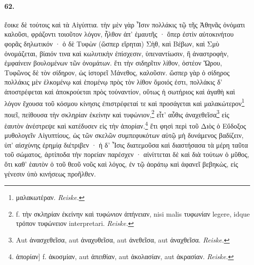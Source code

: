 \documentclass[a4paper, 11pt, oneside, polutonikogreek, german, landscape]{article}
\begin{document}
\paragraph{62.}
ἔοικε δὲ τούτοις καὶ τὰ Αἰγύπτια. τὴν μὲν γὰρ Ἶσιν πολλάκις τῷ τῆς Ἀθηνᾶς ὀνόματι καλοῦσι, φράζοντι τοιοῦτον λόγον, ἦλθον ἀπ' ἐμαυτῆς · ὅπερ ἐστὶν αὐτοκινήτου φορᾶς δηλωτικόν · ὁ δὲ Τυφὼν (ὥσπερ εἴρηται) Σὴθ, καὶ Βέβων, καὶ Σμὺ ὀνομάζεται, βίαιόν τινα καὶ κωλυτικὴν ἐπίσχεσιν, ὑπεναντίωσιν, ἢ ἀναστροφὴν, ἐμφαίνειν βουλομένων τῶν ὀνομάτων. ἔτι τὴν σιδηρῖτιν λίθον, ὀστέον Ὥρου, Τυφῶνος δὲ τὸν σίδηρον, ὡς ἱστορεῖ Μάνεθος, καλοῦσιν. ὥσπερ γὰρ ὁ σίδηρος πολλάκις μὲν ἑλκομένῳ καὶ ἑπομένῳ πρὸς τὸν λίθον ὅμοιός ἐστι, πολλάκις δ' ἀποστρέφεται καὶ ἀποκρούεται πρὸς τοὐναντίον, οὕτως ἡ σωτήριος καὶ ἀγαθὴ καὶ λόγον ἔχουσα τοῦ κόσμου κίνησις ἐπιστρέφεταί τε καὶ προσάγεται καὶ μαλακώτερον\footnote{μαλακωτέραν. \emph{Reiske.}} ποιεῖ, πείθουσα τὴν σκληρίαν ἐκείνην καὶ τυφώνιον,\footnote{f. τὴν σκληρίαν ἐκείνην καὶ τυφώνιον ἀπήνειαν, nisi malis τυφωνίαν legere, idque τρόπον τυφώνειον interpretari. \emph{Reiske.}} εἶτ' αὖθις ἀναχεθεῖσα\footnote{Aut ἀνασχεθεῖσα, aut ἀναχυθεῖσα, aut ἀνεθεῖσα, aut ἀναχθεῖσα. \emph{Reiske.}} εἰς ἑαυτὸν ἀνέστρεψε καὶ κατέδυσεν εἰς τὴν ἀπορίαν.\footnote{ἀπορίαν] f. ἀκοσμίαν, aut ἀπειθίαν, aut ἀκολασίαν, aut ἀκρασίαν. \emph{Reiske.}} ἔτι φησὶ περὶ τοῦ Διὸς ὁ Εὔδοξος μυθολογεῖν Αἰγυπτίους, ὡς τῶν σκελῶν συμπεφυκότων αὐτῷ μὴ δυνάμενος βαδίζειν, ὑπ' αἰσχύνης ἐρημίᾳ διέτριβεν · ἡ δ' Ἶσις διατεμοῦσα καὶ διαστήσασα τὰ μέρη ταῦτα τοῦ σώματος, ἀρτίποδα τὴν πορείαν παρέσχεν · αἰνίττεται δὲ καὶ διὰ τούτων ὁ μῦθος, ὅτι καθ' ἑαυτὸν ὁ τοῦ θεοῦ νοῦς καὶ λόγος, ἐν τῷ ἀοράτῳ καὶ ἀφανεῖ βεβηκὼς, εἰς γένεσιν ὑπὸ κινήσεως προῆλθεν.
\end{document}
